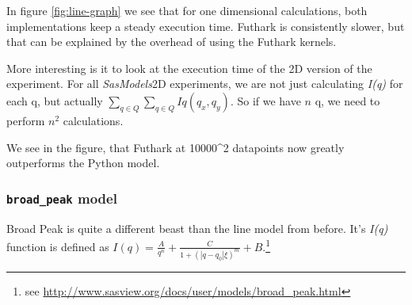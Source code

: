 \documentclass[11pt]{article}
\newcommand{\sasmodels}{\textit{SasModels}}
\newcommand{\iq}{\textit{I(q)}}
\begin{document}
In figure \ref{fig:line-graph} we see that for one dimensional calculations,
both implementations keep a steady execution time. Futhark is consistently 
slower, but that can be explained by the overhead of using the Futhark kernels.

More interesting is it to look at the execution time of the 2D version of the 
experiment. For all \sasmodels 2D experiments, we are not just calculating \iq
for each q, but actually $\sum_{q \in Q} \sum_{q \in Q} Iq(q_x, q_y)$.
So if we have $n$ q, we need to perform $n^2$ calculations.

We see in the figure, that Futhark at 10000^2 datapoints now greatly outperforms
the Python model.

\subsubsection{\texttt{broad\_peak} model}
Broad Peak is quite a different beast than the line model from before. It's \iq
function is defined as 
$I(q) = \frac{A}{q^n} + \frac{C}{1 + (|q - q_0|\xi)^m} + B$.\footnote{see \url{http://www.sasview.org/docs/user/models/broad_peak.html}}
\end{document}
